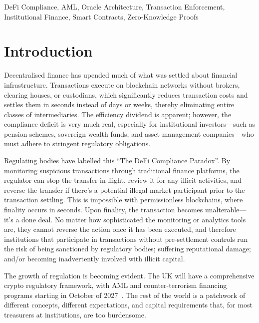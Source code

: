 \documentclass[journal]{IEEEtran}
\begin{document}
\begin{IEEEkeywords}
DeFi Compliance, AML, Oracle Architecture, Transaction Enforcement, Institutional Finance, Smart Contracts, Zero-Knowledge Proofs
\end{IEEEkeywords}

\section{Introduction}

Decentralised finance has upended much of what was settled about financial infrastructure. Transactions execute on blockchain networks without brokers, clearing houses, or custodians, which significantly reduces transaction costs and settles them in seconds instead of days or weeks, thereby eliminating entire classes of intermediaries. The efficiency dividend is apparent; however, the compliance deficit is very much real, especially for institutional investors---such as pension schemes, sovereign wealth funds, and asset management companies---who must adhere to stringent regulatory obligations.

Regulating bodies have labelled this ``The DeFi Compliance Paradox''. By monitoring suspicious transactions through traditional finance platforms, the regulator can stop the transfer in-flight, review it for any illicit activities, and reverse the transfer if there's a potential illegal market participant prior to the transaction settling. This is impossible with permissionless blockchains, where finality occurs in seconds. Upon finality, the transaction becomes unalterable---it's a done deal. No matter how sophisticated the monitoring or analytics tools are, they cannot reverse the action once it has been executed, and therefore institutions that participate in transactions without pre-settlement controls run the risk of being sanctioned by regulatory bodies; suffering reputational damage; and/or becoming inadvertently involved with illicit capital.

The growth of regulation is becoming evident. The UK will have a comprehensive crypto regulatory framework, with AML and counter-terrorism financing programs starting in October of 2027~\cite{fca2025}. The rest of the world is a patchwork of different concepts, different expectations, and capital requirements that, for most treasurers at institutions, are too burdensome.
\end{document}
